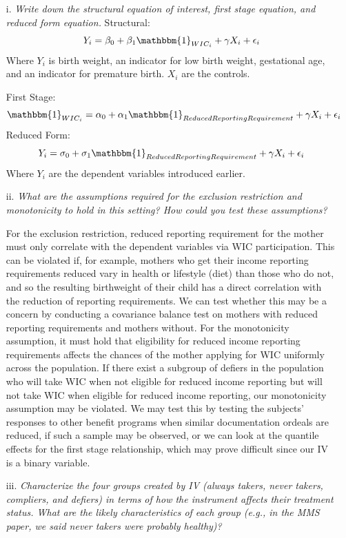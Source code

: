 \documentclass[
]{article}
\begin{document}
\begin{enumerate}
\item[i.] \textit{Write down the structural equation of interest, first stage equation, and reduced form equation.}
\newline
\newline
Structural: 
\[Y_i = \beta_0 + \beta_1 \mathbbm{1}_{WIC_i} + \gamma X_i + \epsilon_i\]
Where $Y_i$ is birth weight, an indicator for low birth weight, gestational age, and an indicator for premature birth. $X_i$ are the controls.  

First Stage: 
\[\mathbbm{1}_{WIC_i} = \alpha_0 + \alpha_1 \mathbbm{1}_{ReducedReportingRequirement} + \gamma X_i + \epsilon_i\]
Reduced Form:  
\[Y_i = \sigma_0 + \sigma_1 \mathbbm{1}_{ReducedReportingRequirement} + \gamma X_i + \epsilon_i\]
Where $Y_i$ are the dependent variables introduced earlier.  
  
\item[ii.] \textit{What are the assumptions required for the exclusion restriction and monotonicity to hold in this setting? How could you test these assumptions?}  
  
For the exclusion restriction, reduced reporting requirement for the mother must only correlate with the dependent variables via WIC participation. This can be violated if, for example, mothers who get their income reporting requirements reduced vary in health or lifestyle (diet) than those who do not, and so the resulting birthweight of their child has a direct correlation with the reduction of reporting requirements. We can test whether this may be a concern by conducting a covariance balance test on mothers with reduced reporting requirements and mothers without.\newline
For the monotonicity assumption, it must hold that eligibility for reduced income reporting requirements affects the chances of the mother applying for WIC uniformly across the population. If there exist a subgroup of defiers in the population who will take WIC when not eligible for reduced income reporting but will not take WIC when eligible for reduced income reporting, our monotonicity assumption may be violated. We may test this by testing the subjects' responses to other benefit programs when similar documentation ordeals are reduced, if such a sample may be observed, or we can look at the quantile effects for the first stage relationship, which may prove difficult since our IV is a binary variable. 
  
\item[iii.] \textit{Characterize the four groups created by IV (always takers, never takers, compliers, and defiers) in terms of how the instrument affects their treatment status. What are the likely characteristics of each group (e.g., in the MMS paper, we said never takers were probably healthy)?}  
  

\end{enumerate}
\end{document}
